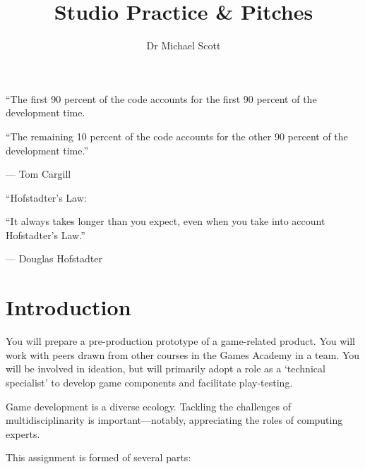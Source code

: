 \documentclass{../../fal_assignment}
\title{Studio Practice \& Pitches}
\author{Dr Michael Scott}
\begin{document}
\maketitle

\begin{marginquote}
    ``The first 90 percent of the code accounts for the first 90 percent of the development time.
    
    ``The remaining 10 percent of the code accounts for the other 90 percent of the development time.''
    
    --- Tom Cargill
    
    \marginquoterule
    
    ``Hofstadter's Law:
    
    ``It always takes longer than you expect, even when you take into account Hofstadter's Law.''
    
    --- Douglas Hofstadter
\end{marginquote}

\section*{Introduction}

You will prepare a pre-production prototype of a game-related product. You will work with peers drawn from other courses in the Games Academy in a team. You will be involved in ideation, but will primarily adopt a role as a `technical specialist' to develop game components and facilitate play-testing.

Game development is a diverse ecology. Tackling the challenges of multidisciplinarity is important---notably, appreciating the roles of computing experts.

This assignment is formed of several parts:
\end{document}
